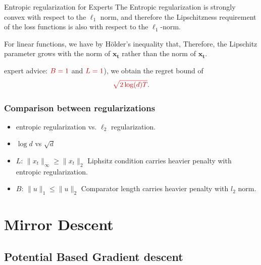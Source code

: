 \documentclass[handout]{beamer}
\newcommand{\redmath}[1]{\textcolor{mathred}{#1}}
\begin{document}
\begin{frame}{Entropic regularization for Experts}
    The Entropic regularization is strongly convex with respect to the \( \ell_1 \) norm, and therefore the Lipschitzness requirement of the loss functions is also with respect to the \( \ell_1 \)-norm. 
    
    For linear functions, 
    \R{\[
    f_t(\mathbf{w}) = \langle \mathbf{w}, \mathbf{x_t} \rangle,
    \]}
    we have by Hölder’s inequality that,
    \R{\[
    | f_t(\mathbf{w}) - f_t(\mathbf{u}) | = | \langle \mathbf{w} - \mathbf{u}, \mathbf{x_t} \rangle | 
    \leq \| \mathbf{w} - \mathbf{u} \|_1 \|\mathbf{x_t} \|_\infty.
    \]}
    Therefore, the Lipschitz parameter grows with the \R{\( \ell_\infty \)} norm of \( \mathbf{x_t} \) rather than the  norm of \( \mathbf{x_t} \). 
    
    expert advice: \( \redmath{B = 1} \) and \( \redmath{L = 1} \)), we obtain the regret bound of 
    \[
    \redmath{\sqrt{2\log(d)T}}.
    \]
\end{frame}

\begin{frame}
  \frametitle{Comparison between regularizations}
  \begin{itemize}
  \item entropic regularization vs. $\ell_2$ regularization.
  \item $\log {d}$ vs $\sqrt{d}$
  \item $L$: $\|x_t\|_{\infty} \geq \|x_t\|_{2}$ Liphsitz condition carries heavier penalty with entropic regularization.
  \item $B$: $\|u\|_1 \leq \|u\|_{2}$ Comparator length carries heavier penalty with $l_2$ norm.
  \end{itemize}
\end{frame}


\section{Mirror Descent}

\subsection{Potential Based Gradient descent}
\end{document}
